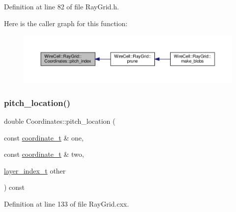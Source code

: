 Definition at line 82 of file Ray\+Grid.\+h.

Here is the caller graph for this function\+:
\nopagebreak
\begin{figure}[H]
\begin{center}
\leavevmode
\includegraphics[width=350pt]{class_wire_cell_1_1_ray_grid_1_1_coordinates_a8b371cd1c56cfdf12677d69f9e58fcbc_icgraph}
\end{center}
\end{figure}
\mbox{\label{class_wire_cell_1_1_ray_grid_1_1_coordinates_ab201bc4926236a43676cbac2a7953158}} 
\subsubsection{\texorpdfstring{pitch\+\_\+location()}{pitch\_location()}}
{\footnotesize\ttfamily double Coordinates\+::pitch\+\_\+location (\begin{DoxyParamCaption}\item[{const \hyperlink{struct_wire_cell_1_1_ray_grid_1_1coordinate__t}{coordinate\+\_\+t} \&}]{one,  }\item[{const \hyperlink{struct_wire_cell_1_1_ray_grid_1_1coordinate__t}{coordinate\+\_\+t} \&}]{two,  }\item[{\hyperlink{namespace_wire_cell_1_1_ray_grid_ab7562e54b58eede813d5b70b5eb85812}{layer\+\_\+index\+\_\+t}}]{other }\end{DoxyParamCaption}) const}



Definition at line 133 of file Ray\+Grid.\+cxx.

